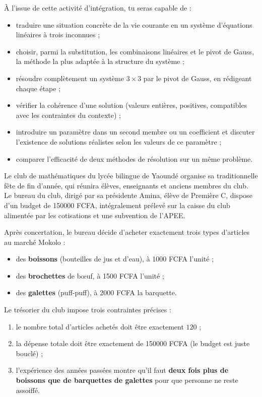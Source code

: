 \documentclass[11pt]{article}
\newcounter{popsec}
\newcounter{popsub}
\newcommand{\courssub}[1]{%
  \stepcounter{popsub}%
  \par\vspace{9pt}\noindent{\popxbold\fontsize{11.5}{13}\selectfont\color{popink}{\color{poporange}\thepopsec.\thepopsub}\hspace{6pt}#1}\par\nopagebreak\vspace{4pt}
}
\begin{document}
À l'issue de cette activité d'intégration, tu seras capable de :
\begin{itemize}
\item traduire une situation concrète de la vie courante en un système d'équations linéaires à trois inconnues ;
\item choisir, parmi la substitution, les combinaisons linéaires et le pivot de Gauss, la méthode la plus adaptée à la structure du système ;
\item résoudre complètement un système $3\times 3$ par le pivot de Gauss, en rédigeant chaque étape ;
\item vérifier la cohérence d'une solution (valeurs entières, positives, compatibles avec les contraintes du contexte) ;
\item introduire un paramètre dans un second membre ou un coefficient et discuter l'existence de solutions réalistes selon les valeurs de ce paramètre ;
\item comparer l'efficacité de deux méthodes de résolution sur un même problème.
\end{itemize}

\courssub{Situation}

Le club de mathématiques du lycée bilingue de Yaoundé organise sa traditionnelle fête de fin d'année, qui réunira élèves, enseignants et anciens membres du club. Le bureau du club, dirigé par sa présidente Amina, élève de Première C, dispose d'un budget de \num{150000} FCFA, intégralement prélevé sur la caisse du club alimentée par les cotisations et une subvention de l'APEE.

Après concertation, le bureau décide d'acheter exactement trois types d'articles au marché Mokolo :
\begin{itemize}
\item des \textbf{boissons} (bouteilles de jus et d'eau), à \num{1000} FCFA l'unité ;
\item des \textbf{brochettes} de bœuf, à \num{1500} FCFA l'unité ;
\item des \textbf{galettes} (puff-puff), à \num{2000} FCFA la barquette.
\end{itemize}

Le trésorier du club impose trois contraintes précises :
\begin{enumerate}
\item le nombre total d'articles achetés doit être exactement $120$ ;
\item la dépense totale doit être exactement de \num{150000} FCFA (le budget est juste bouclé) ;
\item l'expérience des années passées montre qu'il faut \textbf{deux fois plus de boissons que de barquettes de galettes} pour que personne ne reste assoiffé.
\end{enumerate}
\end{document}

